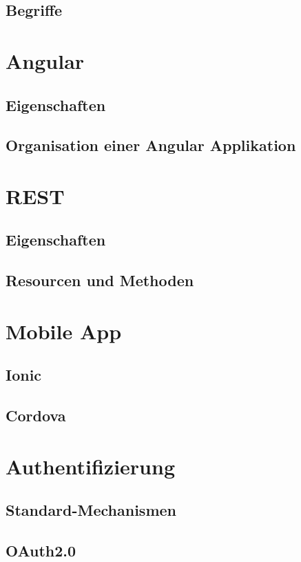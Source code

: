 \documentclass[a4paper, 11pt]{article}
\begin{document}
\subsection{Begriffe}

\section{Angular}
\subsection{Eigenschaften}

\subsection{Organisation einer Angular Applikation}

\section{REST}
\subsection{Eigenschaften}

\subsection{Resourcen und Methoden}

\section{Mobile App}
\subsection{Ionic}

\subsection{Cordova}

\section{Authentifizierung}
\subsection{Standard-Mechanismen}

\subsection{OAuth2.0}
\end{document}
